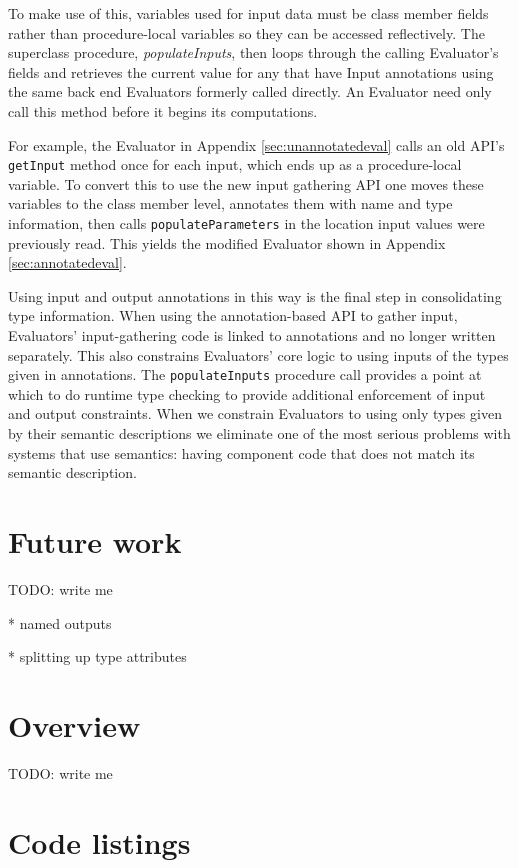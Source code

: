 \documentclass{article}
\begin{document}
To make use of this, variables used for input data must be class member fields rather than procedure-local variables so they can be accessed reflectively.
The superclass procedure, \emph{populateInputs}, then loops through the calling Evaluator's fields and retrieves the current value for any that have Input annotations using the same back end Evaluators formerly called directly.
An Evaluator need only call this method before it begins its computations.

For example, the Evaluator in Appendix \ref{sec:unannotatedeval} calls an old API's \texttt{getInput} method once for each input, which ends up as a procedure-local variable.
To convert this to use the new input gathering API one moves these variables to the class member level, annotates them with name and type information, then calls \texttt{populateParameters} in the location input values were previously read.
This yields the modified Evaluator shown in Appendix \ref{sec:annotatedeval}.

Using input and output annotations in this way is the final step in consolidating type information.
When using the annotation-based API to gather input, Evaluators' input-gathering code is linked to annotations and no longer written separately.
This also constrains Evaluators' core logic to using inputs of the types given in annotations.
The \texttt{populateInputs} procedure call provides a point at which to do runtime type checking to provide additional enforcement of input and output constraints.
When we constrain Evaluators to using only types given by their semantic descriptions we eliminate one of the most serious problems with systems that use semantics:  having component code that does not match its semantic description.

\section{Future work}

TODO:  write me

* named outputs

* splitting up type attributes

\section{Overview}

TODO:  write me

\clearpage
\appendix

\section{Code listings}
\end{document}
